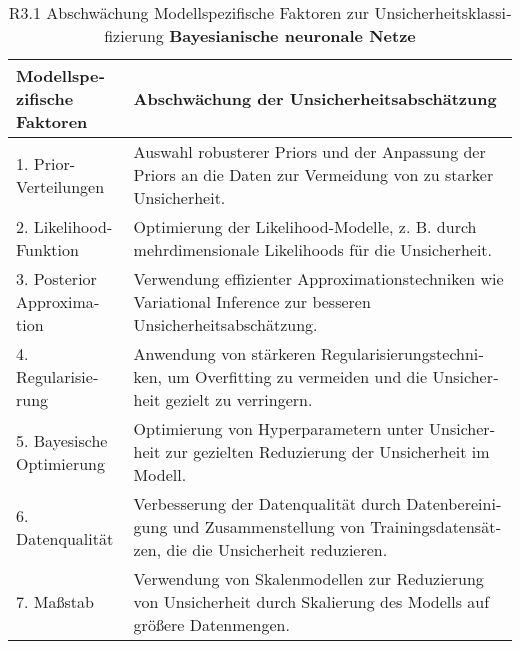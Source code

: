 \begin{otherlanguage}{ngerman}
\begin{table}[!htpb]
  \centering
  \footnotesize
  \begin{tabularx}{\textwidth}{|l|X|}
    \hline
    \textbf{Modellspezifische Faktoren} & \textbf{Abschwächung der Unsicherheitsabschätzung} \\
    \hline
    1. Prior-Verteilungen & Auswahl robusterer Priors und der Anpassung der Priors an die Daten zur Vermeidung von zu starker Unsicherheit. \\
    \hline
    2. Likelihood-Funktion & Optimierung der Likelihood-Modelle, z. B. durch mehrdimensionale Likelihoods für die Unsicherheit. \\
    \hline
    3. Posterior Approximation & Verwendung effizienter Approximationstechniken wie Variational Inference zur besseren Unsicherheitsabschätzung. \\
    \hline
    4. Regularisierung & Anwendung von stärkeren Regularisierungstechniken, um Overfitting zu vermeiden und die Unsicherheit gezielt zu verringern. \\
    \hline
    5. Bayesische Optimierung & Optimierung von Hyperparametern unter Unsicherheit zur gezielten Reduzierung der Unsicherheit im Modell. \\
    \hline
    6. Datenqualität & Verbesserung der Datenqualität durch Datenbereinigung und Zusammenstellung von Trainingsdatensätzen, die die Unsicherheit reduzieren. \\
    \hline
    7. Maßstab & Verwendung von Skalenmodellen zur Reduzierung von Unsicherheit durch Skalierung des Modells auf größere Datenmengen. \\
    \hline
  \end{tabularx}
  \caption{R3.1 Abschwächung Modellspezifische Faktoren zur Unsicherheitsklassifizierung \textbf{\gls{Bayesianische neuronale Netze}}}\label{tab:chapter6r32}
\end{table}


\end{otherlanguage}
